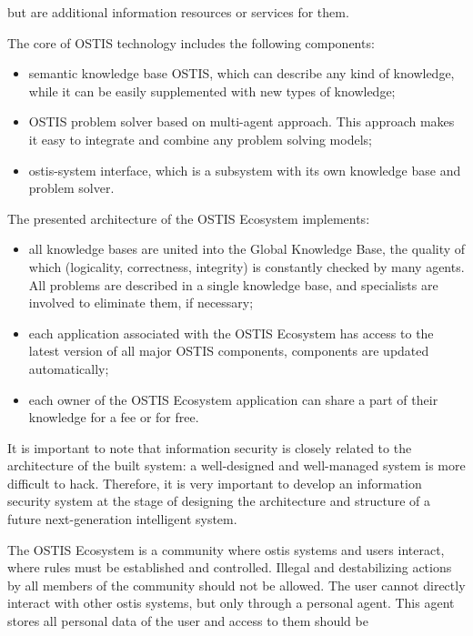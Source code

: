 \documentclass{article}
\begin{document}
\begin{multicols}{2}
\begin{itemize}
but are additional information resources or services
for them.
\end{itemize}
\par 
The core of OSTIS technology includes the following
components:
\begin{itemize}
    \item semantic knowledge base OSTIS, which can describe
any kind of knowledge, while it can be easily
supplemented with new types of knowledge;
    \item OSTIS problem solver based on multi-agent approach. This approach makes it easy to integrate
and combine any problem solving models;
    \item ostis-system interface, which is a subsystem with its
own knowledge base and problem solver.
\end{itemize}
\par
The presented architecture of the OSTIS Ecosystem
implements:
    \begin{itemize}
        \item  all knowledge bases are united into the Global
Knowledge Base, the quality of which (logicality,
correctness, integrity) is constantly checked by many
agents. All problems are described in a single knowledge base, and specialists are involved to
eliminate them, if necessary;
    \item each application associated with the OSTIS Ecosystem has access to the latest version of all major
OSTIS components, components are updated automatically;
    \item each owner of the OSTIS Ecosystem application can
share a part of their knowledge for a fee or for free.
\end{itemize}
    \par
It is important to note that information security is
closely related to the architecture of the built system: a
well-designed and well-managed system is more difficult
to hack. Therefore, it is very important to develop an
information security system at the stage of designing
the architecture and structure of a future next-generation
intelligent system.
    \par 
The OSTIS Ecosystem is a community where ostis
systems and users interact, where rules must be established and controlled. Illegal and destabilizing actions by
all members of the community should not be allowed.
The user cannot directly interact with other ostis systems,
but only through a personal agent. This agent stores all
personal data of the user and access to them should be

\end{multicols}
\end{document}
